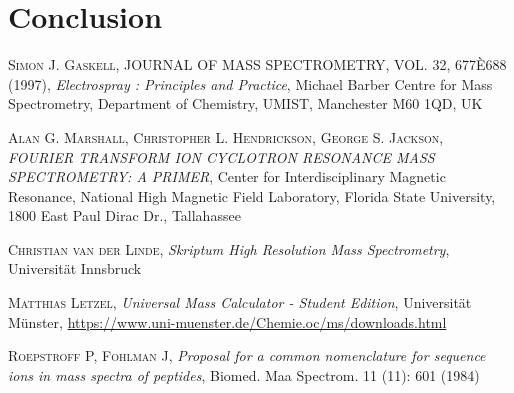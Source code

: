 \documentclass[a4paper,10pt]{article}
\begin{document}
\section{Conclusion}


\begin{thebibliography}{99}
\textsc{Simon J. Gaskell}, JOURNAL OF MASS SPECTROMETRY, VOL. 32, 677È688 (1997), \textit{Electrospray : Principles and Practice}, Michael Barber Centre for Mass Spectrometry, Department of Chemistry, UMIST, Manchester M60 1QD, UK

\textsc{Alan G. Marshall, Christopher L. Hendrickson, George S. Jackson}, \textit{FOURIER TRANSFORM ION CYCLOTRON RESONANCE MASS SPECTROMETRY: A PRIMER}, Center for Interdisciplinary Magnetic Resonance, National High Magnetic Field Laboratory, Florida State University, 1800 East Paul Dirac Dr., Tallahassee

\textsc{Christian van der Linde}, \textit{Skriptum High Resolution Mass Spectrometry}, Universität Innsbruck

\textsc{Matthias Letzel}, \textit{Universal Mass Calculator - Student Edition}, Universität Münster, \url{https://www.uni-muenster.de/Chemie.oc/ms/downloads.html}

\textsc{Roepstroff P, Fohlman J}, \textit{Proposal for a common nomenclature for sequence ions in mass spectra of peptides}, Biomed. Maa Spectrom. 11 (11): 601 (1984)


\end{thebibliography}
\end{document}
